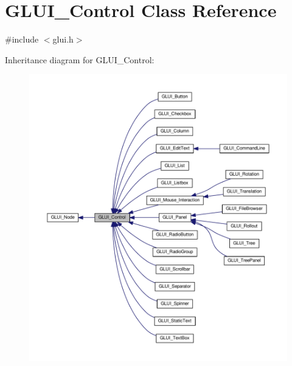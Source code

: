 \hypertarget{class_g_l_u_i___control}{\section{G\+L\+U\+I\+\_\+\+Control Class Reference}
\label{class_g_l_u_i___control}
}


{\ttfamily \#include $<$glui.\+h$>$}



Inheritance diagram for G\+L\+U\+I\+\_\+\+Control\+:\nopagebreak
\begin{figure}[H]
\begin{center}
\leavevmode
\includegraphics[width=350pt]{class_g_l_u_i___control__inherit__graph}
\end{center}
\end{figure}


